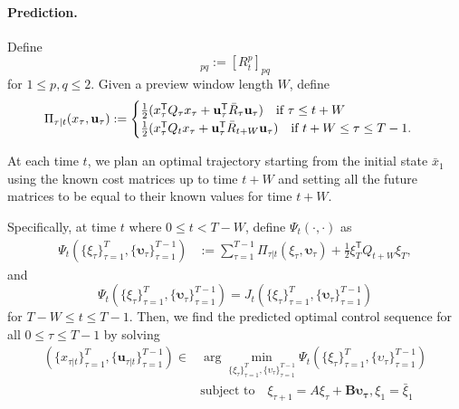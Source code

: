 \documentclass[letterpaper, 10 pt, conference]{ieeeconf}  %
\newcommand{\transpose}{\mathsf{T}}
\begin{document}
\paragraph{Prediction. } 
Define
\begin{equation}
    [\bar{R}_{t}]_{pq} := [R_{t}^{p}]_{pq}
\end{equation}
for $1 \leq p,q \leq 2$. Given a preview window length $W$, define
\begin{equation}
\begin{split}
    \Pi_{\tau|t}(x_{\tau},\mathbf{u}_{\tau}) := 
    \begin{cases}
        \frac{1}{2} (x_{\tau}^{\transpose}Q_{\tau}x_{\tau} +  \mathbf{u}_{\tau}^{\transpose}\bar{R}_{\tau}\mathbf{u}_{\tau}) \text{\quad if $\tau \leq t+W$}\\
        \frac{1}{2} (x_{\tau}^{\transpose}Q_{t}x_{\tau} + \mathbf{u}_{\tau}^{\transpose}\bar{R}_{t+W}\mathbf{u}_{\tau}) \text{\quad if $t+W \leq \tau \leq T-1$}.
    \end{cases}
\end{split}
\end{equation}

At each time $t$, we plan an optimal trajectory starting from the initial state $\bar{x}_{1}$ using the known cost matrices up to time $t+W$ and setting all the future matrices to be equal to their known values for time $t+W$.

Specifically, at time $t$ where $0\leq t < T-W$, define $\Psi_{t}(\cdot,\cdot)$ as
\begin{align}
\Psi_{t}(\{\xi_{\tau}\}_{\tau=1}^{T},\{\boldsymbol{\upsilon}_{\tau}\}_{\tau=1}^{T-1}) &:= \sum_{\tau=1}^{T-1} \Pi_{\tau|t}(\xi_{\tau},\boldsymbol{\upsilon}_{\tau}) + \frac{1}{2} \xi_{T}^{\transpose}Q_{t+W}\xi_{T},
\end{align}
and 
\begin{equation}
    \Psi_{t}(\{\xi_{\tau}\}_{\tau=1}^{T},\{\boldsymbol{\upsilon}_{\tau}\}_{\tau=1}^{T-1}) = J_{t}(\{\xi_{\tau}\}_{\tau=1}^{T},\{\boldsymbol{\upsilon}_{\tau}\}_{\tau=1}^{T-1})
\end{equation}
for $T-W \leq t \leq T-1$.
Then, we find the predicted optimal control sequence for all $0\leq \tau\leq T-1$ by solving
\begin{equation}
\begin{split}
    (\{x_{\tau|t}\}_{\tau=1}^{T}, \{\mathbf{u}_{\tau|t}\}_{\tau=1}^{T-1}) \in &\arg\min_{\{\xi_{\tau}\}_{\tau=1}^{T},\{\upsilon_{\tau}\}_{\tau=1}^{T-1}} \Psi_{t}(\{\xi_{\tau}\}_{\tau=1}^{T},\{\upsilon_{\tau}\}_{\tau=1}^{T-1})\\
    &\text{subject to}\quad \xi_{\tau+1} = A\xi_{\tau} + \mathbf{B}\mathbf{\upsilon_{\tau}}, \xi_{1} = \bar{\xi}_{1}
\end{split}
\end{equation}
\end{document}
